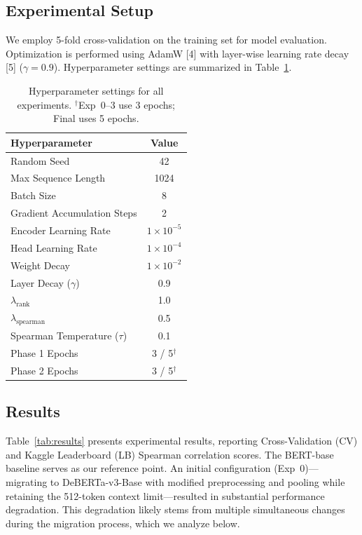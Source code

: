 \documentclass{article}
\begin{document}
\subsection{Experimental Setup}
We employ 5-fold cross-validation on the training set for model evaluation. Optimization is performed using AdamW [4] with layer-wise learning rate decay [5] ($\gamma = 0.9$). Hyperparameter settings are summarized in Table~\ref{tab:hyperparams}.

\begin{table}[h]
  \caption{Hyperparameter settings for all experiments. $^\dagger$Exp~0--3 use 3 epochs; Final uses 5 epochs.}
  \label{tab:hyperparams}
  \centering
  \begin{tabular}{lc}
    \toprule
    \textbf{Hyperparameter} & \textbf{Value} \\
    \midrule
    Random Seed & 42 \\
    Max Sequence Length & 1024 \\
    Batch Size & 8 \\
    Gradient Accumulation Steps & 2 \\
    Encoder Learning Rate & $1 \times 10^{-5}$ \\
    Head Learning Rate & $1 \times 10^{-4}$ \\
    Weight Decay & $1 \times 10^{-2}$ \\
    Layer Decay ($\gamma$) & 0.9 \\
    $\lambda_{\text{rank}}$ & 1.0 \\
    $\lambda_{\text{spearman}}$ & 0.5 \\
    Spearman Temperature ($\tau$) & 0.1 \\
    Phase 1 Epochs & 3 / 5$^\dagger$ \\
    Phase 2 Epochs & 3 / 5$^\dagger$ \\
    \bottomrule
  \end{tabular}
\end{table}

\subsection{Results}
Table~\ref{tab:results} presents experimental results, reporting Cross-Validation (CV) and Kaggle Leaderboard (LB) Spearman correlation scores. The BERT-base baseline serves as our reference point. An initial configuration (Exp~0)---migrating to DeBERTa-v3-Base with modified preprocessing and pooling while retaining the 512-token context limit---resulted in substantial performance degradation. This degradation likely stems from multiple simultaneous changes during the migration process, which we analyze below.
\end{document}
